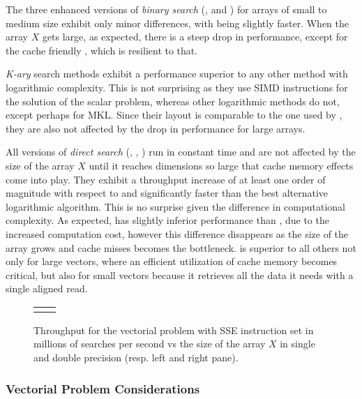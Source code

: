 \documentclass[preprint,1p,times]{elsarticle}
\begin{document}
The three enhanced versions of \textit{binary search} (\textit{\BitSetName}, \textit{\ClassicOffsetName} and \textit{\EytzingerName}) for arrays of small to medium size exhibit only minor differences, with \textit{\BitSetName} being slightly faster. When the array $X$ gets large, as expected, there is a steep drop in performance, except for the cache friendly \textit{\EytzingerName}, which is resilient to that.

\textit{K-ary} search methods exhibit a performance superior to any other method with logarithmic complexity. This is not surprising as they use SIMD instructions for the solution of the scalar problem, whereas other logarithmic methods do not, except perhaps for MKL. Since their layout is comparable to the one used by \textit{\EytzingerName}, they are also not affected by the drop in performance for large arrays.

All versions of \textit{direct search} (\textit{\DirectName}, \textit{\DirectGapName}, \textit{\DirectCacheName}) run in constant time and are not affected by the size of the array $X$ until it reaches dimensions so large that cache memory effects come into play. They exhibit a throughput increase of at least one order of magnitude with respect to \textit{\ClassicName} and significantly faster than the best alternative logarithmic algorithm. This is no surprise given the difference in computational complexity. As expected, \textit{\DirectGapName} has slightly inferior performance than \textit{\DirectName}, due to the increased computation cost, however this difference disappears as the size of the array grows and cache misses becomes the bottleneck. \textit{\DirectCacheName} is superior to all others not only for large vectors, where an efficient utilization of cache memory becomes critical, but also for small vectors because it retrieves all the data it needs with a single aligned read.

\begin{figure}\begin{tabular}{@{\hskip1pt}c@{\hskip1pt} @{\hskip1pt}c@{\hskip1pt}}
		\perfchart{SSE}{single} & \perfchart{SSE}{double}
	\end{tabular}
\vspace*{-4mm}
	\caption{Throughput for the vectorial problem with SSE instruction set in millions of searches per second vs the size of the array $X$ in single and double precision (resp. left and right pane).}
	\label{fig:perf-SSE}\end{figure}


\subsubsection{Vectorial Problem Considerations}
\end{document}
